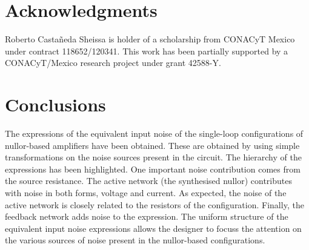 \documentclass{ecctd01}
\begin{document}
\begin{comment}
\begin{itemize}
\item {\bf Step 4} The two-port transformation is used on the source
$i_{n,eq,1}$ which is located at the amplier output. The result is
added with $u_{n,eq,2}$ and the result becomes the equivalent input
noise source $u_{n,eq,in}$ as shown in Figure \ref{trans4}.
Then a noiseless-amplifier is obtained.
\end{itemize}

\begin{figure}[hbtp]
\centerline{
\epsfxsize=50mm
\epsffile{/home/jarocho/tex/noise_castour/figuras/transadmittance_3.eps}}
\caption{Voltage Noise Sources Added and I-Shift Applied.}
\label{trans4}
\end{figure} 
\end{comment}

\section{Acknowledgments}
Roberto Casta\~neda Sheissa
is holder of a scholarship from CONACyT Mexico under contract
118652/120341.
This work has been partially supported by a CONACyT/Mexico
research project under grant 42588-Y.

\section{Conclusions}
The expressions of the equivalent input noise of the single-loop
configurations of nullor-based amplifiers have been obtained.
These are obtained by using simple transformations on the noise sources
present in the circuit.
The hierarchy of the expressions has been highlighted.
One important noise contribution comes from the source resistance.
The active network (the synthesised nullor) contributes with noise in both
forms, voltage and current. As expected, the noise of the active network
is closely related to the resistors of the configuration.
Finally, the feedback network adds noise to the expression.
The uniform structure of the equivalent input noise expressions
allows the designer to focuss the attention on the various sources of noise
present in the nullor-based configurations.


\end{document}
